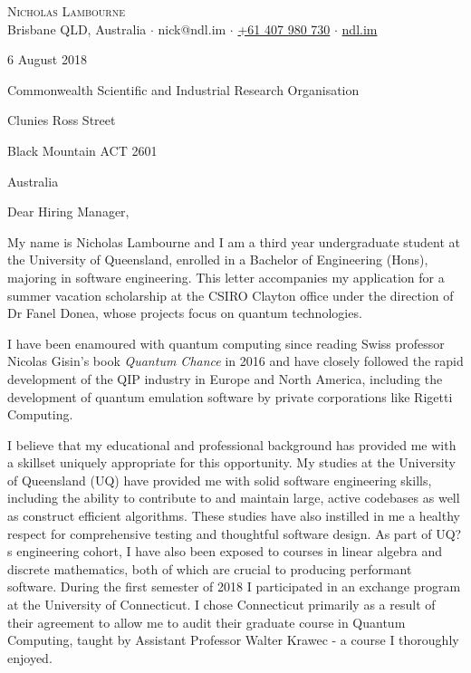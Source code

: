 \documentclass[a4paper]{article}
\begin{document}
\vspace*{-50pt}

\begin{center}
	{\Huge \scshape {Nicholas Lambourne}}\\
	\vspace{3pt}
	Brisbane QLD, Australia $\cdot$ nick@ndl.im $\cdot$ \href{tel:61407980730}{+61 407 980 730} $\cdot$ \href{https://ndl.im}{ndl.im}\\
	\hrulefill
\end{center}

\vspace{5pt}

6 August 2018

\vspace{25pt}

Commonwealth Scientific and Industrial Research Organisation

Clunies Ross Street

Black Mountain ACT 2601

Australia

\vspace{25pt}

Dear Hiring Manager,

\vspace{25pt}

My name is Nicholas Lambourne and I am a third year undergraduate student at the University of Queensland, enrolled in a Bachelor of Engineering (Hons), majoring in software engineering. This letter accompanies my application for a summer vacation scholarship at the CSIRO Clayton office under the direction of Dr Fanel Donea, whose projects focus on quantum technologies.

\vspace{12pt}

I have been enamoured with quantum computing since reading Swiss professor Nicolas Gisin's book \textit{Quantum Chance} in 2016 and have closely followed the rapid development of the QIP industry in Europe and North America, including the development of quantum emulation software by private corporations like Rigetti Computing. 

\vspace{12pt}

I believe that my educational and professional background has provided me with a skillset uniquely appropriate for this opportunity. My studies at the University of Queensland (UQ) have provided me with solid software engineering skills, including the ability to contribute to and maintain large, active codebases as well as construct efficient algorithms. These studies have also instilled in me a healthy respect for comprehensive testing and thoughtful software design. As part of UQ?s engineering cohort, I have also been exposed to courses in linear algebra and discrete mathematics, both of which are crucial to producing performant software. During the first semester of 2018 I participated in an exchange program at the University of Connecticut. I chose Connecticut primarily as a result of their agreement to allow me to audit their graduate course in Quantum Computing, taught by Assistant Professor Walter Krawec - a course I thoroughly enjoyed.
\end{document}
